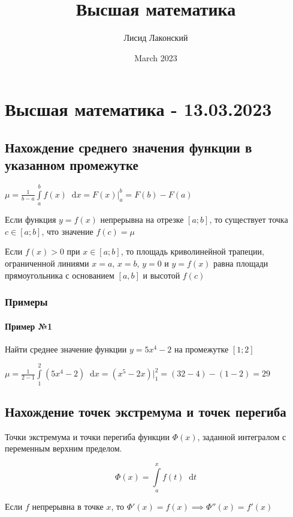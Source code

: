 \documentclass{article}
\title{Высшая математика}
\author{Лисид Лаконский}
\date{March 2023}
\newcommand*\diff{\mathop{}\!\mathrm{d}}
\begin{document}
\raggedright

\maketitle

\tableofcontents
\pagebreak

\section{Высшая математика - 13.03.2023}

\subsection{Нахождение среднего значения функции в указанном промежутке}

$\mu = \frac{1}{b - a} \int\limits_{a}^{b} f(x) \diff x = F(x)\bigg|_{a}^{b} = F(b) - F(a)$

Если функция $y = f(x)$ непрерывна на отрезке $[a; b]$, то существует точка $c \in [ a; b ]$, что значение $f(c) = \mu$

Если $f(x) > 0$ при $x \in [a; b]$, то площадь криволинейной трапеции, ограниченной линиями $x = a$, $x = b$, $y = 0$ и $y = f(x)$ равна площади прямоугольника с основанием $[a, b]$ и высотой $f(c)$

\subsubsection{Примеры}

\paragraph{Пример №1} Найти среднее значение функции $y = 5x^4 - 2$ на промежутке $[1; 2]$

$\mu = \frac{1}{2 - 1} \int\limits_{1}^{2} (5x^4 - 2) \diff x = (x^5 - 2x) \bigg|_{1}^{2} = (32 - 4) - (1 - 2) = 29$

\subsection{Нахождение точек экстремума и точек перегиба}

Точки экстремума и точки перегиба функции $\Phi (x)$, заданной интегралом с переменным верхним пределом.

$$
\Phi(x) = \int\limits_{a}^{x} f(t) \diff t
$$

Если $f$ непрерывна в точке $x$, то $\Phi'(x) = f(x) \implies \Phi''(x) = f'(x)$
\end{document}
